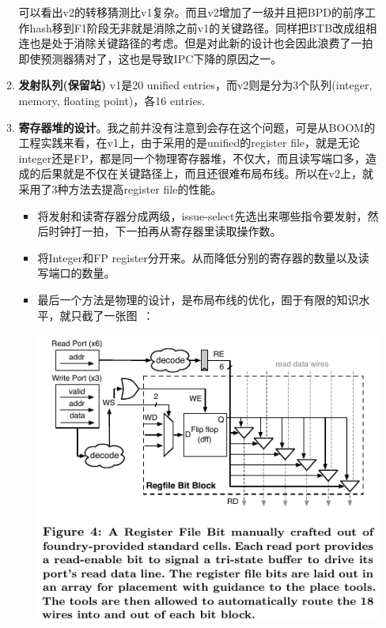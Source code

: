 \documentclass{article}
\begin{document}
\begin{multicols}{2}
\begin{itemize}
\begin{enumerate}
			可以看出v2的转移猜测比v1复杂。而且v2增加了一级并且把BPD的前序工作hash移到F1阶段无非就是消除之前v1的关键路径。同样把BTB改成组相连也是处于消除关键路径的考虑。但是对此新的设计也会因此浪费了一拍即使预测器猜对了，这也是导致IPC下降的原因之一。
			\item \textbf{发射队列(保留站)}
			v1是20 unified entries，而v2则是分为3个队列(integer, memory, floating point)，各16 entries.~\cite{Celio:EECS-2017-157}
			\item \textbf{寄存器堆的设计}。我之前并没有注意到会存在这个问题，可是从BOOM的工程实践来看，在v1上，由于采用的是unified的register file，就是无论integer还是FP，都是同一个物理寄存器堆，不仅大，而且读写端口多，造成的后果就是不仅在关键路径上，而且还很难布局布线。所以在v2上，就采用了3种方法去提高register file的性能。\begin{itemize}
				\item 将发射和读寄存器分成两级，issue-select先选出来哪些指令要发射，然后时钟打一拍，下一拍再从寄存器里读取操作数。
				\item 将Integer和FP register分开来。从而降低分别的寄存器的数量以及读写端口的数量。
				\item 最后一个方法是物理的设计，是布局布线的优化，囿于有限的知识水平，就只截了一张图~\cite{Celio:EECS-2017-157}：
				
				\includegraphics[width=\linewidth]{figs/regfile.png}
			\end{itemize}
			\end{enumerate}
		\end{itemize}
	\end{multicols}
\end{document}
